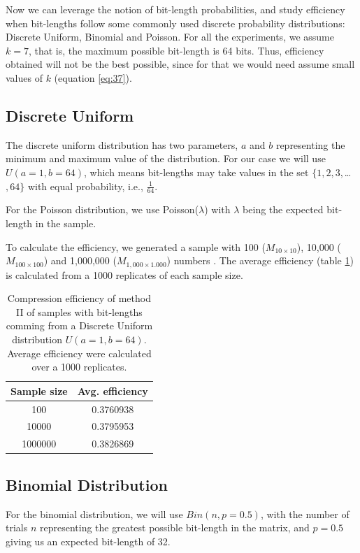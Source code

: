 \documentclass[10pt]{article}
\begin{document}
Now we can leverage the notion of bit-length probabilities, and study efficiency when bit-lengths follow some  commonly used discrete probability distributions: Discrete Uniform, Binomial and Poisson. For all the experiments, we assume $k=7$, that is, the maximum possible bit-length is 64 bits. Thus, efficiency obtained will not be the best possible, since for that we would need assume small values of $k$ (equation \ref{eq:37}). 

\subsection*{Discrete Uniform}
The discrete uniform distribution has two parameters, $a$ and $b$ representing the minimum and maximum value of the distribution. For our case we will use $U(a=1,b=64)$, which means bit-lengths may take values in the set $\{1, 2, 3, $\ldots$, 64\}$ with equal probability, i.e., $\frac{1}{64}$. 

For the Poisson distribution, we use Poisson($\lambda$) with $\lambda$ being the expected bit-length in the sample. 

To calculate the efficiency, we generated a sample with 100 ($M_{10 \times 10}$), 10,000 ($M_{100 \times 100}$) and 1,000,000 ($M_{1,000 \times 1.000}$) numbers . The average efficiency (table \ref{tab:03}) is calculated from a 1000 replicates of each sample size.

\begin{table}[h]
  \centering
  \caption{Compression efficiency of method II of samples with bit-lengths comming from a Discrete Uniform distribution $U(a=1,b=64)$. Average efficiency were calculated over a 1000 replicates.}
 \begin{tabular}{cc}
    \hline
    Sample size & Avg. efficiency \\
    \hline
     100	& 0.3760938 \\
     10000 	& 0.3795953 \\
     1000000 	& 0.3826869 \\
    \hline
 \end{tabular}
 \label{tab:03}
\end{table}

\subsection*{Binomial Distribution}

For the binomial distribution, we will use $Bin(n, p=0.5)$, with the number of trials $n$ representing the greatest possible bit-length in the matrix, and $p=0.5$ giving us an expected bit-length of 32.
\end{document}
